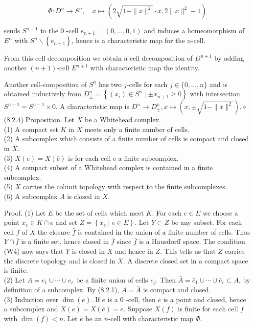 \documentclass[10pt, letterpaper]{article}
\begin{document}
$$
\Phi: D^{n} \rightarrow S^{n}, \quad x \mapsto\left(2 \sqrt{1-\|x\|^{2}} \cdot x, 2\|x\|^{2}-1\right)
$$

sends $S^{n-1}$ to the 0 -cell $e_{n+1}=(0, \ldots, 0,1)$ and induces a homeomorphism of $E^{n}$ with $S^{n} \backslash\left\{e_{n+1}\right\}$, hence is a characteristic map for the $n$-cell.

From this cell decomposition we obtain a cell decomposition of $D^{n+1}$ by adding another $(n+1)$-cell $E^{n+1}$ with characteristic map the identity.

Another cell-composition of $S^{n}$ has two $j$-cells for each $j \in\{0, \ldots, n\}$ and is obtained inductively from $D_{ \pm}^{n}=\left\{\left(x_{i}\right) \in S^{n} \mid \pm x_{n+1} \geq 0\right\}$ with intersection $S^{n-1}=S^{n-1} \times 0$. A characteristic map is $D^{n} \rightarrow D_{ \pm}^{n}, x \mapsto\left(x, \pm \sqrt{1-\|x\|^{2}}\right) . \diamond$\\
(8.2.4) Proposition. Let $X$ be a Whitehead complex.\\
(1) A compact set $K$ in $X$ meets only a finite number of cells.\\
(2) A subcomplex which consists of a finite number of cells is compact and closed in $X$.\\
(3) $X(e)=X(\bar{e})$ is for each cell e a finite subcomplex.\\
(4) A compact subset of a Whitehead complex is contained in a finite subcomplex.\\
(5) $X$ carries the colimit topology with respect to the finite subcomplexes.\\
(6) A subcomplex $A$ is closed in $X$.

Proof. (1) Let $E$ be the set of cells which meet $K$. For each $e \in E$ we choose a point $x_{e} \in K \cap e$ and set $Z=\left\{x_{e} \mid e \in E\right\}$. Let $Y \subset Z$ be any subset. For each cell $f$ of $X$ the closure $\bar{f}$ is contained in the union of a finite number of cells. Thus\\
$Y \cap \bar{f}$ is a finite set, hence closed in $\bar{f}$ since $\bar{f}$ is a Hausdorff space. The condition (W4) now says that $Y$ is closed in $X$ and hence in $Z$. This tells us that $Z$ carries the discrete topology and is closed in $X$. A discrete closed set in a compact space is finite.\\
(2) Let $A=e_{1} \cup \cdots \cup e_{r}$ be a finite union of cells $e_{j}$. Then $\bar{A}=\bar{e}_{1} \cup \cdots \cup \bar{e}_{r} \subset A$, by definition of a subcomplex. By (8.2.1), $A=\bar{A}$ is compact and closed.\\
(3) Induction over $\operatorname{dim}(e)$. If $e$ is a 0 -cell, then $e$ is a point and closed, hence a subcomplex and $X(e)=X(\bar{e})=e$. Suppose $X(f)$ is finite for each cell $f$ with $\operatorname{dim}(f)<n$. Let $e$ be an $n$-cell with characteristic map $\Phi$.
\end{document}
